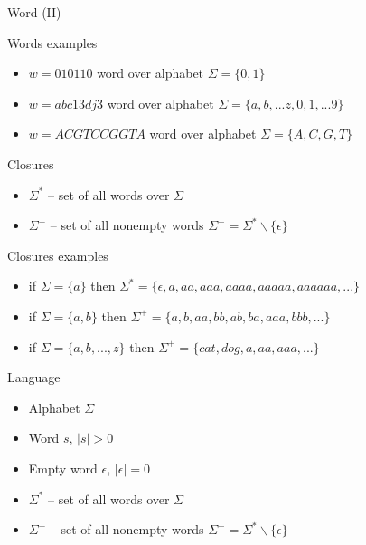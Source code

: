 \documentclass{beamer}
\begin{document}
\begin{frame}{Word (II)}

\begin{exampleblock}{Words examples}
\begin{itemize}
\item $w = 010110$ word over alphabet $\Sigma = \{0, 1\}$
\item $w = abc13dj3$ word over alphabet $\Sigma = \{a, b, ...z, 0, 1, ...9\}$
\item $w = ACGTCCGGTA$ word over alphabet $\Sigma = \{A, C, G, T\}$
\end{itemize}
\end{exampleblock}

\begin{block}{Closures}
\begin{itemize}
\item $\Sigma^{\ast}$ -- set of all words over $\Sigma$
\item $\Sigma^{+}$ -- set of all nonempty words $\Sigma^+=\Sigma^*\backslash\{\epsilon\}$
\end{itemize}
\end{block}

\begin{exampleblock}{Closures examples}
\begin{itemize}
\item if $\Sigma = \{a\}$ then $\Sigma^{\ast} = \{\epsilon, a, aa, aaa, aaaa, aaaaa, aaaaaa, ...\}$
\item if $\Sigma = \{a, b\}$ then $\Sigma^{+} = \{a, b, aa, bb, ab, ba, aaa, bbb, ...\}$
\item if $\Sigma = \{a, b, ..., z\}$ then $\Sigma^{+} = \{cat, dog, a, aa, aaa, ...\}$
\end{itemize}
\end{exampleblock}

\end{frame}

\begin{frame}{Language}
\begin{itemize}
\item Alphabet $\Sigma$
\item Word $s$, $|s| > 0$
\item Empty word $\epsilon$, $|\epsilon| = 0$
\item $\Sigma^{\ast}$ -- set of all words over $\Sigma$
\item $\Sigma^{+}$ -- set of all nonempty words $\Sigma^+=\Sigma^*\backslash\{\epsilon\}$
\end{itemize}
\end{frame}
\end{document}
